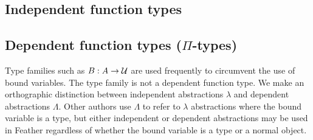 \documentclass[11pt]{book}
\begin{document}
\subsection{Independent function types}

\subsection{Dependent function types (\texorpdfstring{$\Pi$}{Π}-types)}

Type families such as \( B:A \to \mathcal{U} \) are used frequently to circumvent the use of bound variables.
The type family is not a dependent function type.
We make an orthographic distinction between independent abstractions \( \lambda \) and dependent abstractions \( \Lambda \).
Other authors use \( \Lambda \) to refer to \( \lambda \) abstractions where the bound variable is a type, but either independent or dependent abstractions may be used in Feather regardless of whether the bound variable is a type or a normal object.

\end{document}
